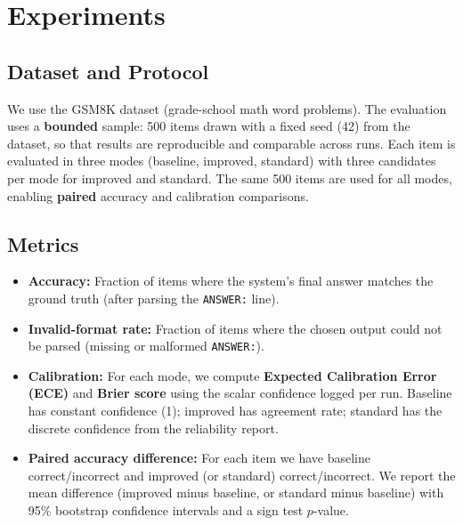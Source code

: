 \documentclass[10pt]{article}
\begin{document}
\section{Experiments}
\label{sec:experiments}

\subsection{Dataset and Protocol}
We use the GSM8K dataset \citep{cobbe2021training} (grade-school math word problems). The evaluation uses a \textbf{bounded} sample: 500 items drawn with a fixed seed (42) from the dataset, so that results are reproducible and comparable across runs. Each item is evaluated in three modes (baseline, improved, standard) with three candidates per mode for improved and standard. The same 500 items are used for all modes, enabling \textbf{paired} accuracy and calibration comparisons.

\subsection{Metrics}
\begin{itemize}
\item \textbf{Accuracy:} Fraction of items where the system's final answer matches the ground truth (after parsing the \texttt{ANSWER:} line).
\item \textbf{Invalid-format rate:} Fraction of items where the chosen output could not be parsed (missing or malformed \texttt{ANSWER:}).
\item \textbf{Calibration:} For each mode, we compute \textbf{Expected Calibration Error (ECE)} and \textbf{Brier score} \citep{guo2017calibration} using the scalar confidence logged per run. Baseline has constant confidence (1); improved has agreement rate; standard has the discrete confidence from the reliability report.
\item \textbf{Paired accuracy difference:} For each item we have baseline correct/incorrect and improved (or standard) correct/incorrect. We report the mean difference (improved minus baseline, or standard minus baseline) with 95\% bootstrap confidence intervals and a sign test $p$-value.
\end{itemize}
\end{document}
